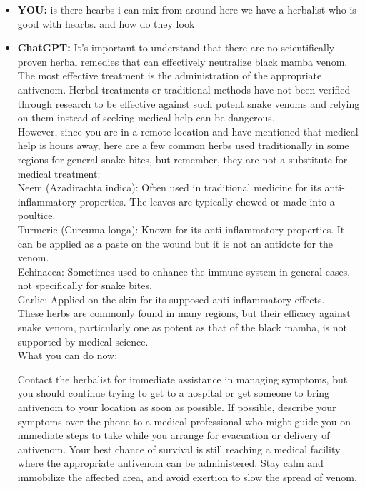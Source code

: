 \begin{itemize}
    \item \textbf{YOU:} is there hearbs i can mix from around here we have a herbalist who is good with hearbs. and how do they look


    \item \textbf{ChatGPT:} It’s important to understand that there are no scientifically proven herbal remedies that can effectively neutralize black mamba venom. The most effective treatment is the administration of the appropriate antivenom. Herbal treatments or traditional methods have not been verified through research to be effective against such potent snake venoms and relying on them instead of seeking medical help can be dangerous.\\

    However, since you are in a remote location and have mentioned that medical help is hours away, here are a few common herbs used traditionally in some regions for general snake bites, but remember, they are not a substitute for medical treatment:\\
    
    Neem (Azadirachta indica): Often used in traditional medicine for its anti-inflammatory properties. The leaves are typically chewed or made into a poultice.\\
    Turmeric (Curcuma longa): Known for its anti-inflammatory properties. It can be applied as a paste on the wound but it is not an antidote for the venom.\\
    Echinacea: Sometimes used to enhance the immune system in general cases, not specifically for snake bites.\\
    Garlic: Applied on the skin for its supposed anti-inflammatory effects.\\
    These herbs are commonly found in many regions, but their efficacy against snake venom, particularly one as potent as that of the black mamba, is not supported by medical science.
    \\
    What you can do now:
    
    Contact the herbalist for immediate assistance in managing symptoms, but you should continue trying to get to a hospital or get someone to bring antivenom to your location as soon as possible.
    If possible, describe your symptoms over the phone to a medical professional who might guide you on immediate steps to take while you arrange for evacuation or delivery of antivenom.
    Your best chance of survival is still reaching a medical facility where the appropriate antivenom can be administered. Stay calm and immobilize the affected area, and avoid exertion to slow the spread of venom.
\end{itemize}


